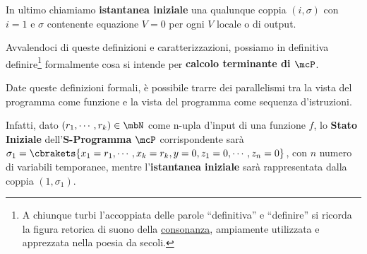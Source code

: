 In ultimo chiamiamo \textbf{istantanea iniziale} una qualunque coppia \((i,\sigma)\) con \(i=1\) e \(\sigma\) contenente equazione \(V=0\) per ogni \(V\) locale o di output.

Avvalendoci di queste definizioni e caratterizzazioni, possiamo in definitiva definire\footnote{A chiunque turbi l'accoppiata delle parole ``definitiva'' e ``definire'' si ricorda la figura retorica di suono della \href{https://en.wikipedia.org/wiki/Literary_consonance}{consonanza}, ampiamente utilizzata e apprezzata nella poesia da secoli.} formalmente cosa si intende per \textbf{calcolo terminante di \(\mcP\)}.

Date queste definizioni formali, è possibile trarre dei parallelismi tra la vista del programma come funzione e la vista del programma come sequenza d'istruzioni.

Infatti, dato \((r_1,\cdots,r_k)\in\mbN\) come n-upla d'input di una funzione \(f\), lo \textbf{Stato Iniziale} dell'\textbf{S-Programma} \(\mcP\) corrispondente sarà
\(\sigma_1 = \cbrakets{x_1=r_1,\cdots,x_k=r_k,y=0,z_1=0,\cdots,z_n=0}\), con \(n\) numero di variabili temporanee, %
mentre l'\textbf{istantanea iniziale} sarà rappresentata dalla coppia \((1,\sigma_1)\).

